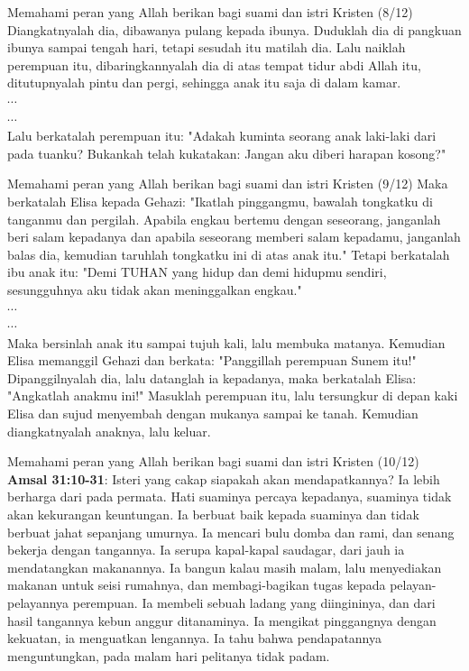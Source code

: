 \documentclass{beamer}
\theoremstyle{mystyle}
\begin{document}
\begin{frame}{Memahami peran yang Allah berikan bagi suami dan istri Kristen (8/12)}
Diangkatnyalah dia, dibawanya pulang kepada ibunya. Duduklah dia di pangkuan ibunya sampai tengah hari, tetapi sesudah itu matilah dia. Lalu naiklah perempuan itu, dibaringkannyalah dia di atas tempat tidur abdi Allah itu, ditutupnyalah pintu dan pergi, sehingga anak itu saja di dalam kamar.	\\
	$\cdots$ \\
	$\cdots$ \\
Lalu berkatalah perempuan itu: "Adakah kuminta seorang anak laki-laki dari pada tuanku? Bukankah telah kukatakan: Jangan aku diberi harapan kosong?" 	
\end{frame}

\begin{frame}{Memahami peran yang Allah berikan bagi suami dan istri Kristen (9/12)}
Maka berkatalah Elisa kepada Gehazi: "Ikatlah pinggangmu, bawalah tongkatku di tanganmu dan pergilah. Apabila engkau bertemu dengan seseorang, janganlah beri salam kepadanya dan apabila seseorang memberi salam kepadamu, janganlah balas dia, kemudian taruhlah tongkatku ini di atas anak itu." Tetapi berkatalah ibu anak itu: "Demi TUHAN yang hidup dan demi hidupmu sendiri, sesungguhnya aku tidak akan meninggalkan engkau."	\\
	$\cdots$ \\
	$\cdots$ \\
 Maka bersinlah anak itu sampai tujuh kali, lalu membuka matanya. Kemudian Elisa memanggil Gehazi dan berkata: "Panggillah perempuan Sunem itu!" Dipanggilnyalah dia, lalu datanglah ia kepadanya, maka berkatalah Elisa: "Angkatlah anakmu ini!" Masuklah perempuan itu, lalu tersungkur di depan kaki Elisa dan sujud menyembah dengan mukanya sampai ke tanah. Kemudian diangkatnyalah anaknya, lalu keluar.				
\end{frame}

\begin{frame}{Memahami peran yang Allah berikan bagi suami dan istri Kristen (10/12)}
		\textbf{Amsal 31:10-31}: Isteri yang cakap siapakah akan mendapatkannya? Ia lebih berharga dari pada permata. Hati suaminya percaya kepadanya, suaminya tidak akan kekurangan keuntungan. Ia berbuat baik kepada suaminya dan tidak berbuat jahat sepanjang umurnya. Ia mencari bulu domba dan rami, dan senang bekerja dengan tangannya. Ia serupa kapal-kapal saudagar, dari jauh ia mendatangkan makanannya. Ia bangun kalau masih malam, lalu menyediakan makanan untuk seisi rumahnya, dan membagi-bagikan tugas kepada pelayan-pelayannya perempuan. Ia membeli sebuah ladang yang diingininya, dan dari hasil tangannya kebun anggur ditanaminya. Ia mengikat pinggangnya dengan kekuatan, ia menguatkan lengannya. Ia tahu bahwa pendapatannya menguntungkan, pada malam hari pelitanya tidak padam. 
\end{frame}
\end{document}
